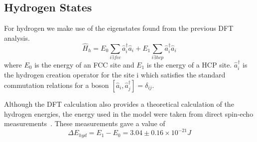 \subsection{Hydrogen States}
For hydrogen
we make use of the
eigenstates found from
the previous DFT
analysis\cite{Jianding-Zhu}.
\begin{equation}
    \hat{H}_{h} =
    E_0 \sum_{i \exists fcc} \hat{a}^\dagger_i \hat{a}_i
    + E_1 \sum_{i \exists hcp} \hat{a}^\dagger_i \hat{a}_i
\end{equation}
where \(E_0\) is the energy of an FCC site and
\(E_1\) is the energy of a HCP site.
\(\hat{a}^\dagger_i\) is
the hydrogen creation
operator for the site i
which satisfies the standard commutation
relations for a boson
\(\left[ \hat{a}_i, \hat{a}^\dagger_j \right]
= \delta_{ij}\).

Although the DFT calculation
also provides a theoretical calculation
of the hydrogen energies, the
energy used in the
model were
taken from direct spin-echo measurements~\cite{Jianding-Zhu}.
These measurements gave a value of
\begin{equation}
    \Delta{}E_{hyd} = E_1 - E_0
    = 3.04\pm0.16\times{}10^{-21} J
    \label{eqn:hydrogen energy difference}
\end{equation}


